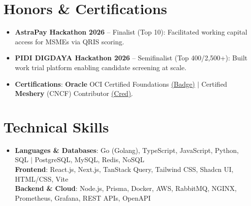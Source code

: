 \documentclass[letterpaper,11pt]{article}
\newcommand{\resumeItem}[1]{\item\small{#1}}
\begin{document}
\section{Honors \& Certifications}
  \begin{itemize}[leftmargin=12pt, label=\tiny$\bullet$, itemsep=0.5pt, parsep=0pt, topsep=0.3pt]
    \resumeItem{\textbf{AstraPay Hackathon 2026} -- Finalist (Top 10): Facilitated working capital access for MSMEs via QRIS scoring.}
    \resumeItem{\textbf{PIDI DIGDAYA Hackathon 2026} -- Semifinalist (Top 400/2,500+): Built work trial platform enabling candidate screening at scale.}
    \resumeItem{\textbf{Certifications}: \textbf{Oracle} OCI Certified Foundations \href{https://catalog-education.oracle.com/ords/certview/sharebadge_m?id=8B649FA58712B4081E58C95EC3618C77402518C510B850A9C86F02FCB73960A5}{\underline{(Badge)}} $|$ Certified \textbf{Meshery} (CNCF) Contributor \href{https://cloud.meshery.io/academy/certificates/dcd71d58-dd35-45d3-86a9-857ac980e08e}{\underline{(Cred)}}.}
  \end{itemize}\vspace{-2pt}

\section{Technical Skills}
  \begin{itemize}[leftmargin=0in, label={}, itemsep=0.5pt, parsep=0pt, topsep=0.3pt]
    \item\small{
      \textbf{Languages \& Databases}{: Go (Golang), TypeScript, JavaScript, Python, SQL $|$ PostgreSQL, MySQL, Redis, NoSQL} \\
      \textbf{Frontend}{: React.js, Next.js, TanStack Query, Tailwind CSS, Shadcn UI, HTML/CSS, Vite} \\
      \textbf{Backend \& Cloud}{: Node.js, Prisma, Docker, AWS, RabbitMQ, NGINX, Prometheus, Grafana, REST APIs, OpenAPI}
    }
  \end{itemize}
\end{document}
